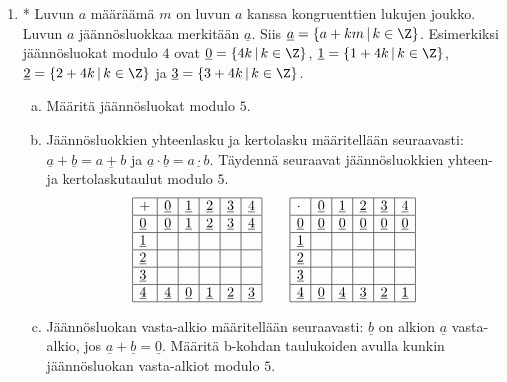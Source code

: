 \begin{enumerate}
\item * %
Luvun $a$ määräämä  $m$ on luvun $a$ kanssa kongruenttien lukujen joukko. Luvun $a$ jäännösluokkaa merkitään $\underline{a}$. Siis $\underline{a} = \{a + km\, |\, k\in \Z\}$. Esimerkiksi jäännösluokat modulo $4$ ovat $\underline{0}=\{4k\, |\, k\in \Z\}$, $\underline{1}=\{1+4k\, |\, k\in \Z\}$, $\underline{2}=\{2+4k\, |\, k\in \Z\}$ ja $\underline{3}=\{3+4k\, |\, k\in \Z\}$.
\begin{enumerate}[a)]
\item Määritä jäännösluokat modulo $5$.
\newpage
\item Jäännösluokkien yhteenlasku ja kertolasku määritellään seuraavasti: $\underline{a} + \underline{b} = \underline{a + b}$ ja $\underline{a} \cdot \underline{b} = \underline{a\cdot b}$. Täydennä seuraavat jäännösluokkien yhteen- ja kertolaskutaulut modulo $5$.
\[
\begin{array}{|l|l|l|l|l|l|}
\hline
+& \underline{0} & \underline{1} & \underline{2} & \underline{3} & \underline{4} \\ \hline
\underline{0} & \underline{0} & \underline{1} & \underline{2} &  \underline{3} & \underline{4}  
\\ \hline
 \underline{1} &&&&& \\ \hline
 \underline{2} &&&&& \\ \hline
 \underline{3} &&&&& \\ \hline
\underline{4} & \underline{4} & \underline{0} & \underline{1} &  \underline{2} & \underline{3}  
\\ \hline
\end{array}
\qquad
\begin{array}{|l|l|l|l|l|l|}
\hline
\cdot& \underline{0} & \underline{1} & \underline{2} & \underline{3} & \underline{4} \\ \hline
\underline{0} & \underline{0} & \underline{0} & \underline{0} &  \underline{0} & \underline{0}  
\\ \hline
 \underline{1} &&&&& \\ \hline
 \underline{2} &&&&& \\ \hline
 \underline{3} &&&&& \\ \hline
\underline{4} & \underline{0} & \underline{4} & \underline{3} &  \underline{2} & \underline{1}  
\\ \hline
\end{array}
\]
\item Jäännösluokan vasta-alkio määritellään seuraavasti: $\underline{b}$ on alkion $\underline{a}$ vasta-alkio, jos $\underline{a} + \underline{b} = \underline{0}$. Määritä b-kohdan  taulukoiden avulla kunkin jäännösluokan vasta-alkiot modulo $5$.

\end{enumerate}
\end{enumerate}
